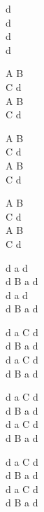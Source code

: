 \begin{chord}
    d\\
    d\\
    d\\
    d

    A B\\
    C d\\
    A B\\
    C d

    A B\\
    C d\\
    A B\\
    C d

    A B\\
    C d\\
    A B\\
    C d

    d a d\\
    d B a d\\
    d a d\\
    d B a d

    d a C d\\
    d B a d\\
    d a C d\\
    d B a d

    d a C d\\
    d B a d\\
    d a C d\\
    d B a d

    d a C d\\
    d B a d\\
    d a C d\\
    d B a d



\end{chord}